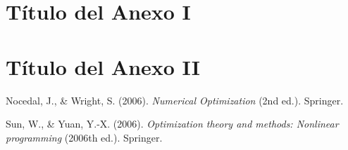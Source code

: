 \documentclass[11pt,a4paper]{book}
\theoremstyle{definition}
\theoremstyle{remark}
\begin{document}
\appendix
\renewcommand{\thechapter}{\Roman{chapter}}
\chapter{Título del Anexo I}


\chapter{Título del Anexo II}

\backmatter

\begin{thebibliography}{99}

%


 Nocedal, J., \& Wright, S. (2006). \emph{Numerical Optimization} (2nd ed.). Springer.

 Sun, W., \& Yuan, Y.-X. (2006). \emph{Optimization theory and methods: Nonlinear programming} (2006th ed.). Springer.

%
\end{thebibliography}
\end{document}
